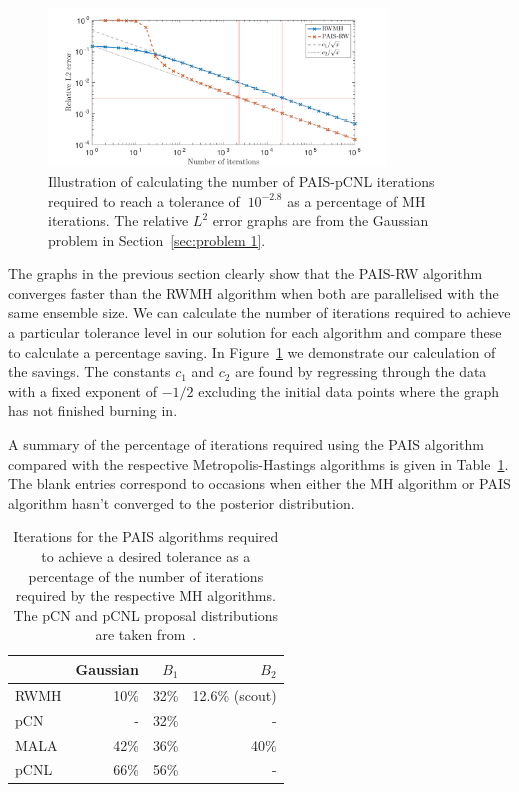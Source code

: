 \documentclass[final]{siamltex}
\begin{document}
\begin{figure}
\begin{center}
\includegraphics[width=0.8\textwidth]{"figures/calc_saving"}
\caption{Illustration of calculating the number of PAIS-pCNL iterations required to reach a tolerance of $~10^{-2.8}$ as a percentage of MH iterations. The relative $L^2$ error graphs are from the Gaussian problem in Section~\ref{sec:problem 1}.}
\label{fig:calc_saving}
\end{center}
\end{figure}

The graphs in the previous section clearly show that the PAIS-RW algorithm converges faster than the RWMH algorithm when both are parallelised with the same ensemble size. We can calculate the number of iterations required to achieve a particular tolerance level in our solution for each algorithm and compare these to calculate a percentage saving. In Figure~\ref{fig:calc_saving} we demonstrate our calculation of the savings. The constants $c_1$ and $c_2$ are found by regressing through the data with a fixed exponent of $-1/2$ excluding the initial data points where the graph has not finished burning in.

A summary of the percentage of iterations required using the PAIS algorithm compared with the respective Metropolis-Hastings algorithms is given in Table~\ref{table:calc_savings}. The blank entries correspond to occasions when either the MH algorithm or PAIS algorithm hasn't converged to the posterior distribution.

\begin{table}[!h]
\centering
\begin{tabular}{|l|r|r|r|}
\hline
		& Gaussian & $B_1$ & $B_2$ \\ \hline
	RWMH & 10\% & 32\% & 12.6\% (scout) \\
	pCN & - & 32\% & - \\
	MALA & 42\% & 36\% & 40\% \\
	pCNL & 66\% & 56\% & - \\ \hline
\end{tabular}
\caption{Iterations for the PAIS algorithms required to achieve a desired tolerance as a percentage of the number of iterations required by the respective MH algorithms. The pCN and pCNL proposal distributions are taken from~\cite{cotter2013mcmc}.}
\label{table:calc_savings}
\end{table}
\end{document}
